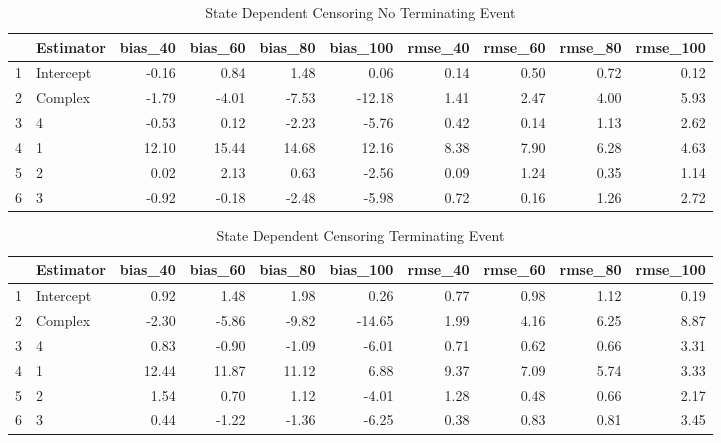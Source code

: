 \begin{table}[ht]
\centering
\begin{tabular}{rlrrrrrrrr}
  \hline
 & Estimator & bias\_40 & bias\_60 & bias\_80 & bias\_100 & rmse\_40 & rmse\_60 & rmse\_80 & rmse\_100 \\ 
  \hline
1 & Intercept & -0.16 & 0.84 & 1.48 & 0.06 & 0.14 & 0.50 & 0.72 & 0.12 \\ 
  2 & Complex & -1.79 & -4.01 & -7.53 & -12.18 & 1.41 & 2.47 & 4.00 & 5.93 \\ 
  3 & 4 & -0.53 & 0.12 & -2.23 & -5.76 & 0.42 & 0.14 & 1.13 & 2.62 \\ 
  4 & 1 & 12.10 & 15.44 & 14.68 & 12.16 & 8.38 & 7.90 & 6.28 & 4.63 \\ 
  5 & 2 & 0.02 & 2.13 & 0.63 & -2.56 & 0.09 & 1.24 & 0.35 & 1.14 \\ 
  6 & 3 & -0.92 & -0.18 & -2.48 & -5.98 & 0.72 & 0.16 & 1.26 & 2.72 \\ 
   \hline
\end{tabular}
\caption{State Dependent Censoring 
 No Terminating Event} 
\end{table}
\begin{table}[ht]
\centering
\begin{tabular}{rlrrrrrrrr}
  \hline
 & Estimator & bias\_40 & bias\_60 & bias\_80 & bias\_100 & rmse\_40 & rmse\_60 & rmse\_80 & rmse\_100 \\ 
  \hline
1 & Intercept & 0.92 & 1.48 & 1.98 & 0.26 & 0.77 & 0.98 & 1.12 & 0.19 \\ 
  2 & Complex & -2.30 & -5.86 & -9.82 & -14.65 & 1.99 & 4.16 & 6.25 & 8.87 \\ 
  3 & 4 & 0.83 & -0.90 & -1.09 & -6.01 & 0.71 & 0.62 & 0.66 & 3.31 \\ 
  4 & 1 & 12.44 & 11.87 & 11.12 & 6.88 & 9.37 & 7.09 & 5.74 & 3.33 \\ 
  5 & 2 & 1.54 & 0.70 & 1.12 & -4.01 & 1.28 & 0.48 & 0.66 & 2.17 \\ 
  6 & 3 & 0.44 & -1.22 & -1.36 & -6.25 & 0.38 & 0.83 & 0.81 & 3.45 \\ 
   \hline
\end{tabular}
\caption{State Dependent Censoring 
 Terminating Event} 
\end{table}
